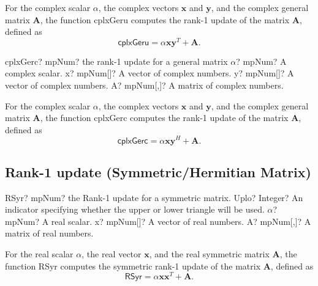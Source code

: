 \vspace{0.3cm}
For the complex scalar $\alpha$, the complex vectors $\boldsymbol{x}$ and $\boldsymbol{y}$, and the complex general matrix $\boldsymbol{A}$, the function \textsf{cplxGeru} computes the rank-1 update of the matrix $\boldsymbol{A}$, defined as
\begin{equation}
\textsf{cplxGeru}= \alpha \boldsymbol{x}  \boldsymbol{y}^T +\boldsymbol{A} .
\end{equation}


\vspace{0.6cm}
\begin{mpFunctionsExtract}
	\mpFunctionFour
	{cplxGerc? mpNum? the rank-1 update for a general matrix}
	{$\alpha$? mpNum? A complex scalar.}
	{x? mpNum[]? A vector of complex numbers.}
	{y? mpNum[]? A vector of complex numbers.}
	{A? mpNum[,]? A matrix of complex numbers.}
\end{mpFunctionsExtract}

\vspace{0.3cm}
For the complex scalar $\alpha$, the complex vectors $\boldsymbol{x}$ and $\boldsymbol{y}$, and the complex general matrix $\boldsymbol{A}$, the function \textsf{cplxGerc} computes the rank-1 update of the matrix $\boldsymbol{A}$, defined as
\begin{equation}
\textsf{cplxGerc}= \alpha \boldsymbol{x}  \boldsymbol{y}^H +\boldsymbol{A} .
\end{equation}





\newpage
\subsection{Rank-1 update (Symmetric/Hermitian Matrix)}

\begin{mpFunctionsExtract}
	\mpFunctionFour
	{RSyr? mpNum? the Rank-1 update for a symmetric matrix.}
	{Uplo? Integer? An indicator specifying whether the upper or lower triangle will be used.}
	{$\alpha$? mpNum? A real scalar.}
	{x? mpNum[]? A vector of real numbers.}
	{A? mpNum[,]? A matrix of real numbers.}
\end{mpFunctionsExtract}

\vspace{0.3cm}
For the real scalar $\alpha$, the real vector $\boldsymbol{x}$, and the real symmetric matrix $\boldsymbol{A}$, the function \textsf{RSyr} computes the symmetric rank-1 update of the matrix $\boldsymbol{A}$, defined as
\begin{equation}
\textsf{RSyr}= \alpha \boldsymbol{x}  \boldsymbol{x}^T +\boldsymbol{A} .
\end{equation}

